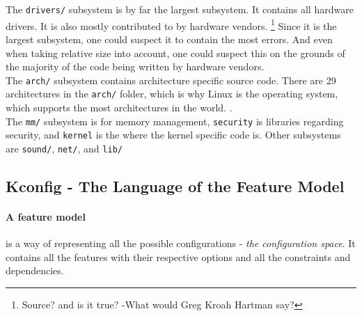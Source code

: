 \documentclass[a4paper,11pt]{report}
\newcommand{\figa}{
    \begin{figure}[!htpb]
    \centering
}
\newcommand{\figb}[2]{
    \caption{#1}
    \label{#2}
    \end{figure}
}
\begin{document}
The \texttt{drivers/} subsystem is by far the largest subsystem. It contains 
all hardware drivers. It is also mostly contributed to by hardware vendors.
    \footnote{Source? and is it true? -What would Greg Kroah Hartman say?}
Since it is the largest subsystem, one could suspect it to contain the most 
errors. And even when taking relative size into account, one could suspect this
on the grounds of the majority of the code being written by hardware vendors.
\\

The \texttt{arch/} subsystem contains architecture specific source code. 
There are 29 architectures in the \texttt{arch/} folder, which is why Linux is 
the operating system, which supports the most architectures in the world.
    \cite{22thbirthday}
.
\\

The \texttt{mm/} subsystem is for memory management, \texttt{security} is 
libraries regarding security, and \texttt{kernel} is the where the kernel 
specific code is. Other subsystems are \texttt{sound/}, \texttt{net/}, and 
\texttt{lib/}

        \subsection{Kconfig - The Language of the Feature Model}

            \paragraph{A feature model} 
is a way of representing all the possible configurations - \emph{the 
configuration space}. It contains all the features with their respective 
options and all the constraints and dependencies.
\end{document}
